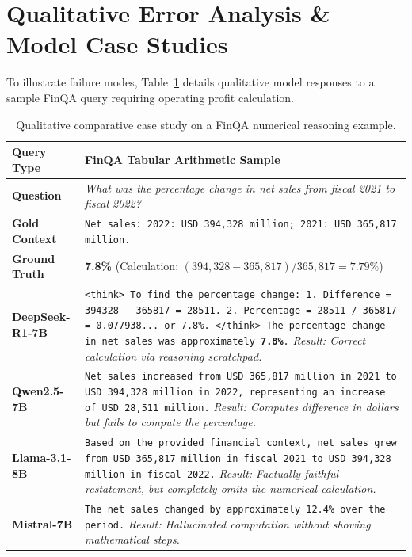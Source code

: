 \documentclass[11pt]{article}
\begin{document}
\section{Qualitative Error Analysis \& Model Case Studies}
\label{sec:app_case_studies}

To illustrate failure modes, Table~\ref{tab:case_studies} details qualitative model responses to a sample FinQA query requiring operating profit calculation.

\begin{table}[h]
\centering
\small
\begin{tabularx}{\textwidth}{lp{}}
\toprule
\textbf{Query Type} & \textbf{FinQA Tabular Arithmetic Sample} \\
\midrule
\textbf{Question} & \textit{What was the percentage change in net sales from fiscal 2021 to fiscal 2022?} \\
\textbf{Gold Context} & \texttt{Net sales: 2022: USD 394,328 million; 2021: USD 365,817 million.} \\
\textbf{Ground Truth} & \textbf{7.8\%} (Calculation: $(394,328 - 365,817) / 365,817 = 7.79\%$) \\
\midrule
\textbf{DeepSeek-R1-7B} & \texttt{<think> To find the percentage change: 1. Difference = 394328 - 365817 = 28511. 2. Percentage = 28511 / 365817 = 0.077938... or 7.8\%. </think> The percentage change in net sales was approximately \textbf{7.8\%}.} \newline \textit{Result: Correct calculation via reasoning scratchpad.} \\
\midrule
\textbf{Qwen2.5-7B} & \texttt{Net sales increased from USD 365,817 million in 2021 to USD 394,328 million in 2022, representing an increase of USD 28,511 million.} \newline \textit{Result: Computes difference in dollars but fails to compute the percentage.} \\
\midrule
\textbf{Llama-3.1-8B} & \texttt{Based on the provided financial context, net sales grew from USD 365,817 million in fiscal 2021 to USD 394,328 million in fiscal 2022.} \newline \textit{Result: Factually faithful restatement, but completely omits the numerical calculation.} \\
\midrule
\textbf{Mistral-7B} & \texttt{The net sales changed by approximately 12.4\% over the period.} \newline \textit{Result: Hallucinated computation without showing mathematical steps.} \\
\bottomrule
\end{tabularx}
\caption{Qualitative comparative case study on a FinQA numerical reasoning example.}
\label{tab:case_studies}
\end{table}
\end{document}

